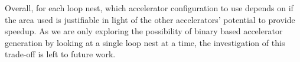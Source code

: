Overall, for each loop nest, which accelerator configuration to use depends on if the area used is justifiable in light of the other accelerators' potential to provide speedup. As we are
only exploring the possibility of binary based accelerator generation by looking at a single loop nest at a time, the investigation of this trade-off is left to future work.

